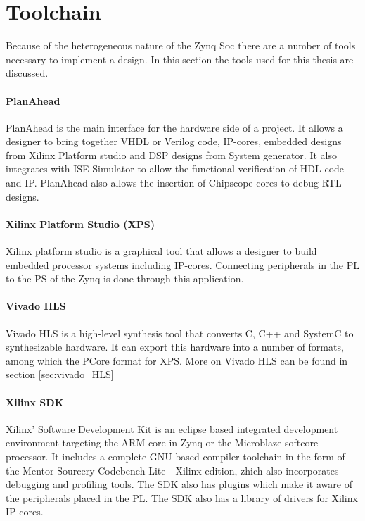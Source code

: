 \section{Toolchain}
Because of the heterogeneous nature of the Zynq Soc there are a number of tools necessary to implement a design. In this section the tools used for this thesis are discussed.

\paragraph{PlanAhead} PlanAhead is the main interface for the hardware side of a project. It allows a designer to bring together VHDL or Verilog code, IP-cores, embedded designs from Xilinx Platform studio and DSP designs from System generator. It also integrates with ISE Simulator to allow the functional verification of HDL code and IP. PlanAhead also allows the insertion of Chipscope cores to debug RTL designs.

\paragraph{Xilinx Platform Studio (XPS)} Xilinx platform studio is a graphical tool that allows a designer to build embedded processor systems including IP-cores. Connecting peripherals in the PL to the PS of the Zynq is done through this application.

\paragraph{Vivado HLS} Vivado HLS is a high-level synthesis tool that converts C, C++ and SystemC to synthesizable hardware. It can export this hardware into a number of formats, among which the PCore format for XPS. More on Vivado HLS can be found in section \ref{sec:vivado_HLS}

\paragraph{Xilinx SDK} Xilinx' Software Development Kit is an eclipse based integrated development environment targeting the ARM core in Zynq or the Microblaze softcore processor. It includes a complete GNU based compiler toolchain in the form of the Mentor Sourcery Codebench Lite - Xilinx edition, zhich also incorporates debugging and profiling tools. The SDK also has plugins which make it aware of the peripherals placed in the PL. The SDK also has a library of drivers for Xilinx IP-cores.

